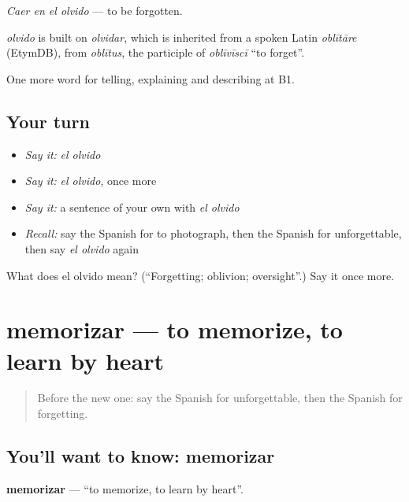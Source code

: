 \emph{Caer en el olvido} — to be forgotten.

\begin{cousinweb}
\emph{olvido} is built on \emph{olvidar}, which is inherited from a spoken Latin \emph{oblītāre} (EtymDB), from \emph{oblītus}, the participle of \emph{oblīvīscī} \textquotedblleft{}to forget\textquotedblright{}.
\end{cousinweb}

\begin{grammarlens}[title={What you've built}]
One more word for telling, explaining and describing at B1.
\end{grammarlens}

\subsection*{Your turn}
\begin{itemize}
\raggedright
  \item \emph{Say it:} \emph{el olvido}
  \item \emph{Say it:} \emph{el olvido}, once more
  \item \emph{Say it:} a sentence of your own with \emph{el olvido}
  \item \emph{Recall:} say the Spanish for to photograph, then the Spanish for unforgettable, then say \emph{el olvido} again
\end{itemize}

\begin{tcolorbox}[breakable,colback=teal!4,colframe=teal!35!black,title={Before you move on}]
What does el olvido mean? (\textquotedblleft{}Forgetting; oblivion; oversight\textquotedblright{}.) Say it once more.
\end{tcolorbox}
\section[memorizar]{memorizar — to memorize, to learn by heart}

\label{lesson:ES-C764-memorizar}



\begin{quote}
Before the new one: say the Spanish for unforgettable, then the Spanish for forgetting.
\end{quote}

\subsection*{You'll want to know: memorizar}
\textbf{memorizar} — \textquotedblleft{}to memorize, to learn by heart\textquotedblright{}.

